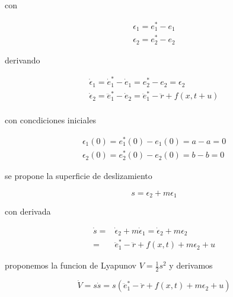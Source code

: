 \begin{flushright}
\end{flushright}

con 

\begin{equation*}
    \begin{aligned}
        \epsilon_1=e_1^*-e_1\\
        \epsilon_2=e_2^*-e_2
    \end{aligned}
\end{equation*}

derivando

\begin{equation*}
    \begin{aligned}
        \dot{\epsilon}_1=\dot{e}_1^*-\dot{e}_1=e_2^*-e_2=\epsilon_2\\
        \dot{\epsilon}_2=\ddot{e}_1^*-\dot{e}_2=\ddot{e}_1^*-\ddot{r}+f(x,t+u)\\
    \end{aligned}
\end{equation*}

con concdiciones iniciales

\begin{equation*}
    \begin{aligned}
        \epsilon_1(0)=e_1^*(0)-e_1(0)=a-a=0\\
        \epsilon_2(0)=e_2^*(0)-e_2(0)=b-b=0
    \end{aligned}
\end{equation*}

se propone la superficie de deslizamiento

\begin{equation*}
    s=\epsilon_2+m\epsilon_1
\end{equation*}

con derivada

\begin{equation*}
    \begin{aligned}
        \dot{s}=&\dot{\epsilon}_2+m\dot{\epsilon}_1=\dot{\epsilon}_2+m\epsilon_2\\
            =& \ddot{e}_1^*-\ddot{r}+f(x,t)+m\epsilon_2+u
    \end{aligned}
\end{equation*}

proponemos la funcion de Lyapunov $V=\frac{1}{2}s^2$ y derivamos

\begin{equation*}
    \dot{V}=s\dot{s}=s(\ddot{e}_1^*-\ddot{r}+f(x,t)+m\epsilon_2+u)
\end{equation*}

